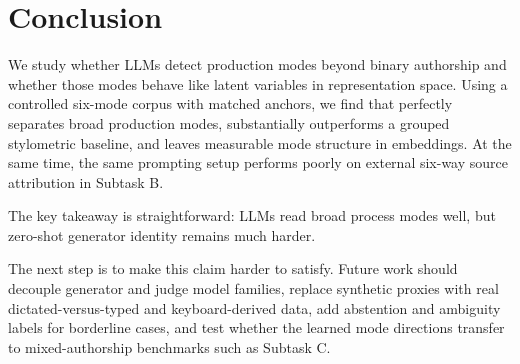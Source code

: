 \section{Conclusion}
\label{sec:conclusion}

We study whether LLMs detect production modes beyond binary authorship and whether those modes behave like latent variables in representation space. Using a controlled six-mode corpus with matched \hcthree anchors, we find that \gptfourone perfectly separates broad production modes, substantially outperforms a grouped stylometric baseline, and leaves measurable mode structure in \embeddingmodel embeddings. At the same time, the same prompting setup performs poorly on external six-way source attribution in \semeval Subtask B.

The key takeaway is straightforward: LLMs read broad process modes well, but zero-shot generator identity remains much harder.

The next step is to make this claim harder to satisfy. Future work should decouple generator and judge model families, replace synthetic proxies with real dictated-versus-typed and keyboard-derived data, add abstention and ambiguity labels for borderline cases, and test whether the learned mode directions transfer to mixed-authorship benchmarks such as \semeval Subtask C.
